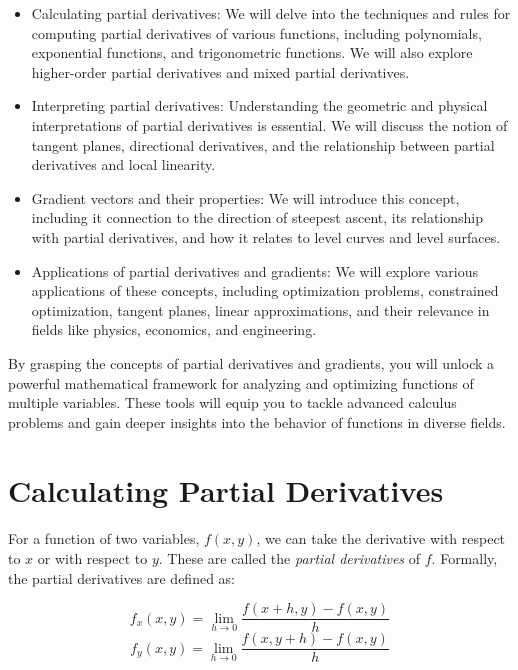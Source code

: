 \begin{itemize}
\item Calculating partial derivatives: We will delve into the
  techniques and rules for computing partial derivatives of various
  functions, including polynomials, exponential functions, and
  trigonometric functions. We will also explore higher-order partial
  derivatives and mixed partial derivatives.

\item Interpreting partial derivatives: Understanding the geometric
  and physical interpretations of partial derivatives is essential. We
  will discuss the notion of tangent planes, directional derivatives,
  and the relationship between partial derivatives and local
  linearity.

\item Gradient vectors and their properties: We will introduce this concept, including it connection to the
  direction of steepest ascent, its relationship with partial
  derivatives, and how it relates to level curves and level surfaces.

\item Applications of partial derivatives and gradients: We will
  explore various applications of these concepts, including
  optimization problems, constrained optimization, tangent planes,
  linear approximations, and their relevance in fields like physics,
  economics, and engineering.
\end{itemize}

By grasping the concepts of partial derivatives and gradients, you
will unlock a powerful mathematical framework for analyzing and
optimizing functions of multiple variables. These tools will equip you
to tackle advanced calculus problems and gain deeper insights into the
behavior of functions in diverse fields.

\section{Calculating Partial Derivatives}
For a function of two variables, $f(x,y)$, we can take the derivative with 
respect to $x$ or with respect to $y$. These are called the \textit{partial 
derivatives} of $f$. Formally, the partial 
derivatives are defined as:

\begin{mdframed}[style = important, frametitle = {Limit Definition of Partial 
Derivatives}]
$$f_x(x, y) = \lim_{h \to 0} \frac{f(x + h, y) - f(x, y)}{h}$$
$$f_y(x, y) = \lim_{h \to 0} \frac{f(x, y + h) - f(x, y)}{h}$$
\end{mdframed}

